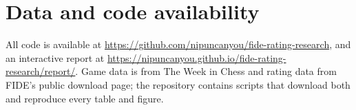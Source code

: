 \documentclass[11pt]{article}
\begin{document}
\section*{Data and code availability}

All code is available at \url{https://github.com/nipuncanyou/fide-rating-research}, and an interactive report at \url{https://nipuncanyou.github.io/fide-rating-research/report/}. Game data is from The Week in Chess and rating data from FIDE's public download page; the repository contains scripts that download both and reproduce every table and figure.



\end{document}
